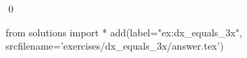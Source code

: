
\begin{ex} 
  \label{ex:dx_equals_3x}
  
  \qed
\end{ex} 
\begin{python0}
from solutions import *
add(label="ex:dx_equals_3x",
    srcfilename='exercises/dx_equals_3x/answer.tex') 
\end{python0}
